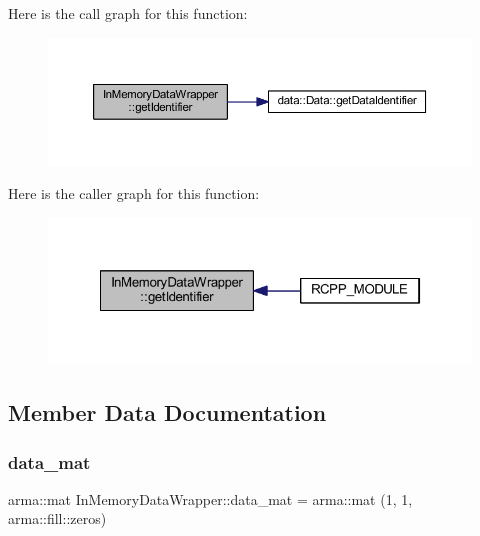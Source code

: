 Here is the call graph for this function\+:\nopagebreak
\begin{figure}[H]
\begin{center}
\leavevmode
\includegraphics[width=350pt]{class_in_memory_data_wrapper_a2a81d397debd1c568f638004090cbdef_cgraph}
\end{center}
\end{figure}
Here is the caller graph for this function\+:\nopagebreak
\begin{figure}[H]
\begin{center}
\leavevmode
\includegraphics[width=322pt]{class_in_memory_data_wrapper_a2a81d397debd1c568f638004090cbdef_icgraph}
\end{center}
\end{figure}


\subsection{Member Data Documentation}
\mbox{\label{class_in_memory_data_wrapper_af48ac59258e61cf5b970c089b19f4e12}} 
\subsubsection{\texorpdfstring{data\+\_\+mat}{data\_mat}}
{\footnotesize\ttfamily arma\+::mat In\+Memory\+Data\+Wrapper\+::data\+\_\+mat = arma\+::mat (1, 1, arma\+::fill\+::zeros)\hspace{0.3cm}{\ttfamily [private]}}

